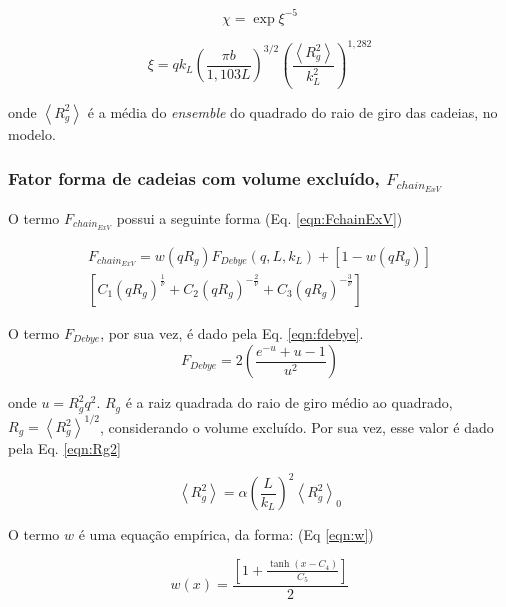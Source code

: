 \begin{apendicesenv}
	\begin{equation}
	\chi = \exp{\xi^{-5}}
	\label{eqn:chi}
	\end{equation}
	
	\begin{equation}
	\xi = q k_L\left(\frac{\pi b}{1,103L}\right)^{3/2}\left(\frac{\left<R_g^2\right>}{k_L^2}\right)^{1,282}
	\label{eqn:xi}
	\end{equation}
	
	\noindent onde $\left<R_g^2\right>$ é a média do \emph{ensemble} do quadrado do raio de giro das cadeias, no modelo.
	
	\subsubsection{Fator forma de cadeias com volume excluído, $F_{chain_{ExV}}$}
	
	O termo $F_{chain_{ExV}}$ possui a seguinte forma (Eq. \ref{eqn:FchainExV})
	
	\begin{multline}
	F_{chain_{ExV}} = w(qR_g)F_{Debye}(q,L,k_L) + \left[1 - w(q R_g)\right] \\ \left[C_1(q R_g)^{\frac{1}{\nu}} + C_2(q R_g)^{-\frac{2}{\nu}} + 
	C_3(q R_g)^{-\frac{3}{\nu}}\right]
	\label{eqn:FchainExV}
	\end{multline}
	
	
	O termo $F_{Debye}$, por sua vez, é dado pela Eq. \ref{eqn:fdebye}.
	\begin{equation}
	F_{Debye} = 2 \left(\frac{e^{-u} + u - 1}{u^2}\right)
	\label{eqn:fdebye}
	\end{equation}
	
	\noindent onde $u = R_g^2q^2$. $R_g$ é a raiz quadrada do raio de giro médio ao quadrado, $R_g = \left<R_g^2\right>^{1/2}$, considerando o volume excluído. Por sua vez, esse valor é dado pela Eq. \ref{eqn:Rg2}
	
	\begin{equation}
	\left<R_g^2\right> = \alpha \left(\frac{L}{k_L}\right)^2\left<R_g^2\right>_0
	\label{eqn:Rg2}
	\end{equation}
	
	O termo $w$ é uma equação empírica, da forma: (Eq \ref{eqn:w})
	
	\begin{equation}
	w(x) = \frac{\left[1 + \frac{\tanh(x-C_4)}{C_5}\right]}{2}
	\label{eqn:w}
	\end{equation}
	

\end{apendicesenv}

